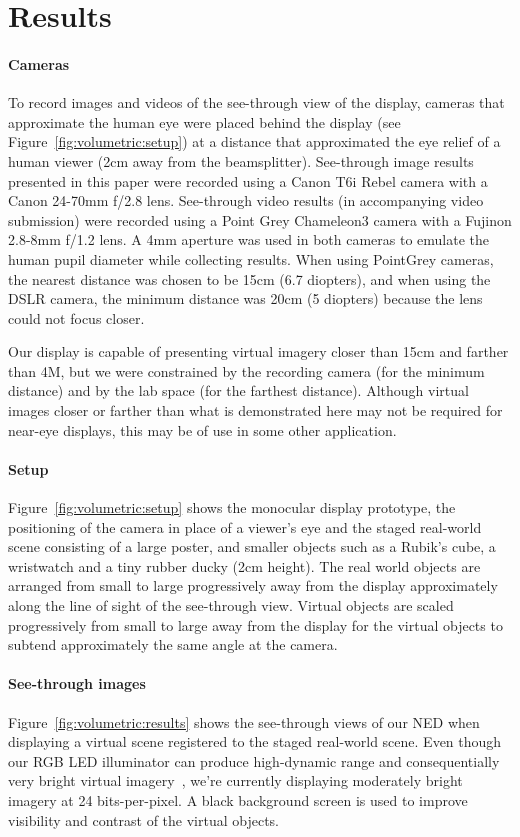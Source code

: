 \section{Results}
\label{sec:volumetric:results}
\paragraph{Cameras}
To record images and videos of the see-through view of the display, cameras that approximate the human eye were placed behind the display (see Figure~\ref{fig:volumetric:setup}) at a distance that approximated the eye relief of a human viewer (2cm away from the beamsplitter). See-through image results presented in this paper were recorded using a Canon T6i Rebel camera with a Canon 24-70mm f/2.8 lens. See-through video results (in accompanying video submission) were recorded using a Point Grey Chameleon3 camera with a Fujinon 2.8-8mm f/1.2 lens. A 4mm aperture was used in both cameras to emulate the human pupil diameter while collecting results. When using PointGrey cameras, the nearest distance was chosen to be 15cm (6.7 diopters), and when using the DSLR camera, the minimum distance was 20cm (5 diopters) because the lens could not focus closer. 

Our display is capable of presenting virtual imagery closer than 15cm and farther than 4M, but we were constrained by the recording camera (for the minimum distance) and by the lab space (for the farthest distance). Although virtual images closer or farther than what is demonstrated here may not be required for near-eye displays, this may be of use in some other application.

\paragraph{Setup}
Figure~\ref{fig:volumetric:setup} shows the monocular display prototype, the positioning of the camera in place of a viewer's eye and the staged real-world scene consisting of a large poster, and smaller objects such as a Rubik's cube, a wristwatch and a tiny rubber ducky (2cm height). The real world objects are arranged from small to large progressively away from the display approximately along the line of sight of the see-through view. Virtual objects are scaled progressively from small to large away from the display for the virtual objects to subtend approximately the same angle at the camera. 

\paragraph{See-through images}
Figure~\ref{fig:volumetric:results} shows the see-through views of our NED when displaying a virtual scene registered to the staged real-world scene. Even though our RGB LED illuminator can produce high-dynamic range and consequentially very bright virtual imagery~\cite{Lincoln2017scene}, we're currently displaying moderately bright imagery at 24 bits-per-pixel. A black background screen is used to improve visibility and contrast of the virtual objects.

